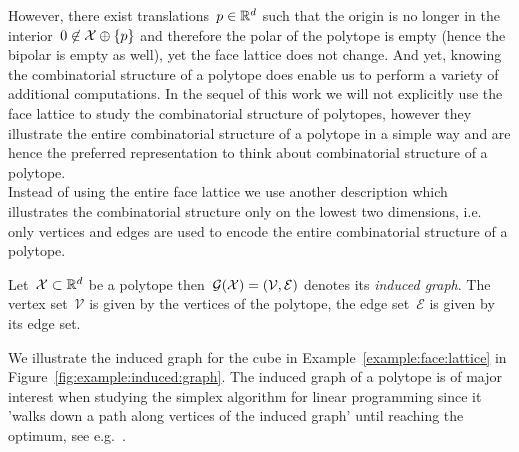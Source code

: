 %
However, there exist translations~$p\in\mathbb R^d$ such that the origin is no longer in the interior~$0\not\in\mathcal X\oplus\{p\}$ and therefore the polar of the polytope is empty (hence the bipolar is empty as well), yet the face lattice does not change.
%
And yet, knowing the combinatorial structure of a polytope does enable us to perform a variety of additional computations.
%
In the sequel of this work we will not explicitly use the face lattice to study the combinatorial structure of polytopes, however they illustrate the entire combinatorial structure of a polytope in a simple way and are hence the preferred representation to think about combinatorial structure of a polytope.
%
\\[1em]
%
Instead of using the entire face lattice we use another description which illustrates the combinatorial structure only on the lowest two dimensions, i.e. only vertices and edges are used to encode the entire combinatorial structure of a polytope.
%
\begin{defi}
Let~$\mathcal X\subset\mathbb R^d$ be a polytope then~$\mathcal G(\mathcal X)=(\mathcal V,\mathcal E)$ denotes its \emph{induced graph}.
%
The vertex set~$\mathcal V$ is given by the vertices of the polytope, the edge set~$\mathcal E$ is given by its edge set.
\end{defi}
%
\noindent We illustrate the induced graph for the cube in Example~\ref{example:face:lattice} in Figure~\ref{fig:example:induced:graph}.
%
The induced graph of a polytope is of major interest when studying the simplex algorithm for linear programming since it 'walks down a path along vertices of the induced graph' until reaching the optimum, see e.g.~\cite{Ziegler:1995}.
%
